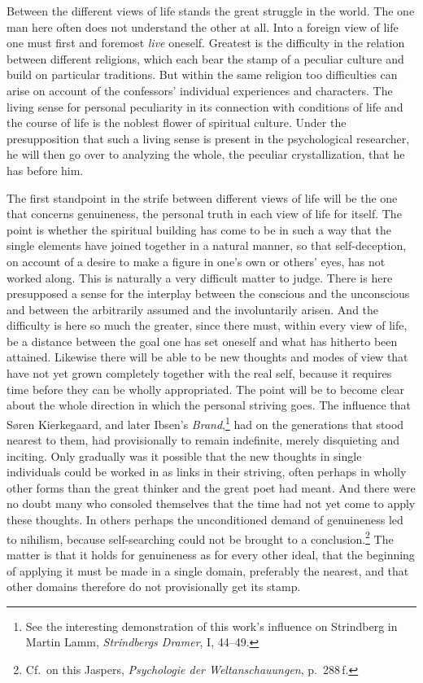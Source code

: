 \documentclass[12pt]{book}
\newcommand{\opage}[1]{\marginnote{\footnotesize\textit{[#1]}}}
\begin{document}
Between the different views of life stands the great \opage{69}struggle in the world. The one man here often does not
understand the other at all. Into a foreign view of life one must first and foremost \textit{live} oneself.
Greatest is the difficulty in the relation between different religions, which each bear the stamp of a peculiar
culture and build on particular traditions. But within the same religion too difficulties can arise on account of
the confessors' individual experiences and characters. The living sense for personal peculiarity in its connection
with conditions of life and the course of life is the noblest flower of spiritual culture. Under the presupposition
that such a living sense is present in the psychological researcher, he will then go over to analyzing the whole,
the peculiar crystallization, that he has before him.

The first standpoint in the strife between different views of life will be the one that concerns genuineness, the
personal truth in each view of life for itself. The point is whether the spiritual building has come to be in such
a way that the single elements have joined together in a natural manner, so that self-deception, on account of a
desire to make a figure in one's own or others' eyes, has not worked along. This is naturally a very difficult
matter to judge. There is here presupposed a sense for the interplay between the conscious and the unconscious and
between the arbitrarily assumed and the involuntarily arisen. And the difficulty is here so much the greater, since
there must, within every view of life, be a distance between the goal one has set oneself and what has hitherto
been attained. Likewise there will be able to be new thoughts and modes of view that have not yet grown completely
together with the real self, because it requires time before they can be wholly appropriated. The point will be to
become clear about the whole direction in which the personal striving \opage{70}goes. The influence that Søren Kierkegaard,
and later Ibsen's \textit{Brand},\footnote{See the interesting demonstration of this work's influence on Strindberg
in Martin Lamm, \textit{Strindbergs Dramer}, I, 44--49.} had on the generations that stood nearest to them, had
provisionally to remain indefinite, merely disquieting and inciting. Only gradually was it possible that the new
thoughts in single individuals could be worked in as links in their striving, often perhaps in wholly other forms
than the great thinker and the great poet had meant. And there were no doubt many who consoled themselves that the
time had not yet come to apply these thoughts. In others perhaps the unconditioned demand of genuineness led to
nihilism, because self-searching could not be brought to a conclusion.\footnote{Cf.\ on this Jaspers,
\textit{Psychologie der Weltanschauungen}, p.\ 288\,f.} The matter is that it holds for genuineness as for every
other ideal, that the beginning of applying it must be made in a single domain, preferably the nearest, and that
other domains therefore do not provisionally get its stamp.
\end{document}
